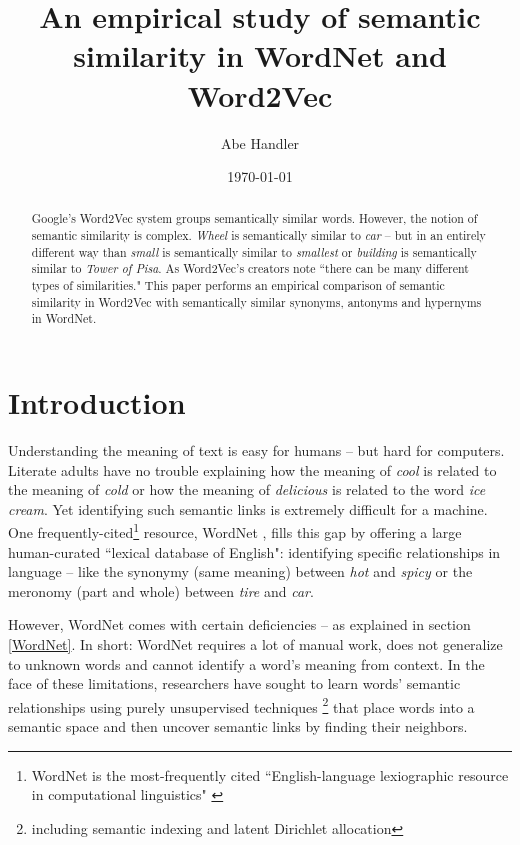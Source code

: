 \documentclass{article}
\title{An empirical study of semantic similarity in WordNet and Word2Vec}
\author{Abe Handler}
\date{\today}
\begin{document}
\begin{abstract}
Google's Word2Vec system groups semantically similar words. However, the notion of semantic similarity is complex. \textit{Wheel} is semantically similar to \textit{car} -- but in an entirely different way than \textit{small} is semantically similar to \textit{smallest} or \textit{building} is semantically similar to \textit{Tower of Pisa}. As Word2Vec's creators  note ``there can be many different types of similarities." This paper performs an empirical comparison of semantic similarity in Word2Vec with semantically similar synonyms, antonyms and hypernyms in WordNet.
\end{abstract}

\maketitle

\section{Introduction}


Understanding the meaning of text is easy for humans -- but hard for computers. Literate adults have no trouble explaining how the meaning of \textit{cool} is related to the meaning of \textit{cold} or how the meaning of \textit{delicious} is related to the word \textit{ice cream}. Yet identifying such semantic links is extremely difficult for a machine. One frequently-cited\footnote{WordNet is the most-frequently cited ``English-language lexiographic resource in computational linguistics" \cite{widdows}} resource, WordNet \cite{wordnet}, fills this gap by offering a large human-curated ``lexical database of English": identifying specific relationships in language -- like the synonymy (same meaning) between \textit{hot} and \textit{spicy} or the meronomy (part and whole) between \textit{tire} and \textit{car}.

However, WordNet comes with certain deficiencies -- as explained in section \ref{WordNet}. In short: WordNet requires a lot of manual work, does not generalize to unknown words and cannot identify a word's meaning from context. In the face of these limitations, researchers have sought to learn words' semantic relationships using purely unsupervised techniques \footnote{including semantic indexing and latent Dirichlet allocation} that place words into a semantic space and then uncover semantic links by finding their neighbors.
\end{document}
